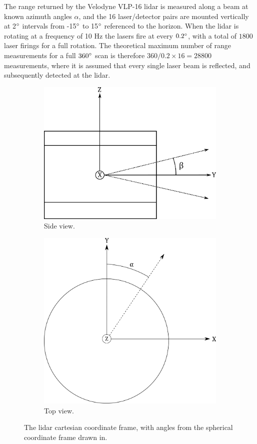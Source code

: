 The range returned by the Velodyne VLP-16 lidar is measured along a beam at known azimuth angles $\alpha$, and the 16 laser/detector pairs are mounted vertically at 2$\degree$ intervals from -15$\degree$ to 15$\degree$ referenced to the horizon. When the lidar is rotating at a frequency of 10 Hz the lasers fire at every $0.2\degree$, with a total of $1800$ laser firings for a full rotation. The theoretical maximum number of range measurements for a full $360\degree$ scan is therefore $360/0.2\times16=28800$ measurements, where it is assumed that every single laser beam is reflected, and subsequently detected at the lidar.
\begin{figure}[H]
	\centering
	\begin{subfigure}{.5\textwidth}
		\centering
		\includegraphics[width=.7\linewidth]{fig/lidar_side.png}
		\caption{Side view.}
		\label{fig:sub_lidarframe}
	\end{subfigure}%
	\begin{subfigure}{.5\textwidth}
		\centering
		\includegraphics[width=.7\linewidth]{fig/lidar_top.png}
		\caption{Top view.}
		\label{fig:sub_lidarframe2}
	\end{subfigure}
	\caption{The lidar cartesian coordinate frame, with angles from the spherical coordinate frame drawn in.}
	\label{fig:lidar_frames}
\end{figure}
